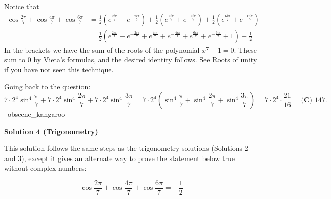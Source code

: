 \begin{enumerate}
 Notice that 
 \begin{align*} \cos \frac{2\pi}{7} + \cos \frac{4\pi}{7} + \cos \frac{6\pi}{7} & = \frac{1}{2}\left(e^\frac{2i\pi}{7}+ e^{-\frac{2i\pi}{7}} \right) + \frac{1}{2}\left( e^\frac{4i\pi}{7}+ e^{-\frac{4i\pi}{7}} \right) + \frac{1}{2}\left( e^\frac{6i\pi}{7}+ e^{-\frac{6i\pi}{7}}\right) \\ & = \frac{1}{2}\left(e^\frac{2i\pi}{7}+ e^{-\frac{2i\pi}{7}}+ e^\frac{4i\pi}{7}+ e^{-\frac{4i\pi}{7}} +e^\frac{6i\pi}{7}+ e^{-\frac{6i\pi}{7}} + 1\right) - \frac{1}{2} \end{align*}
In the brackets we have the sum of the roots of the polynomial $x^7 - 1 = 0$. These sum to $0$ by \href{https://artofproblemsolving.com/wiki/index.php?title=Vieta\%E2\%80\%99s\_formulas}{Vieta’s formulas}, and the desired identity follows. See \href{https://artofproblemsolving.com/wiki/index.php?title=Roots\_of\_unity}{Roots of unity} if you have not seen this technique.

 Going back to the question: 
 \[7 \cdot 2^4 \sin^4 \frac{\pi}{7} + 7 \cdot 2^4 \sin^4 \frac{2 \pi}{7} + 7 \cdot 2^4 \sin^4 \frac{3 \pi}{7} = 7 \cdot 2^4 \left(\sin^4 \frac{\pi}{7} + \sin^4 \frac{2 \pi}{7} + \sin^4 \frac{3 \pi}{7}\right) = 7 \cdot 2^4 \cdot \frac{21}{16} = \boxed{\textbf{(C) }147}.\]~obscene\_kangaroo

 



\textbf{Solution 4 (Trigonometry)}

This solution follows the same steps as the trigonometry solutions (Solutions 2 and 3), except it gives an alternate way to prove the statement below true without complex numbers:

 
 \[\cos \frac{2\pi}{7} + \cos \frac{4\pi}{7} + \cos \frac{6\pi}{7} = -\frac{1}{2}\]


\end{enumerate}

